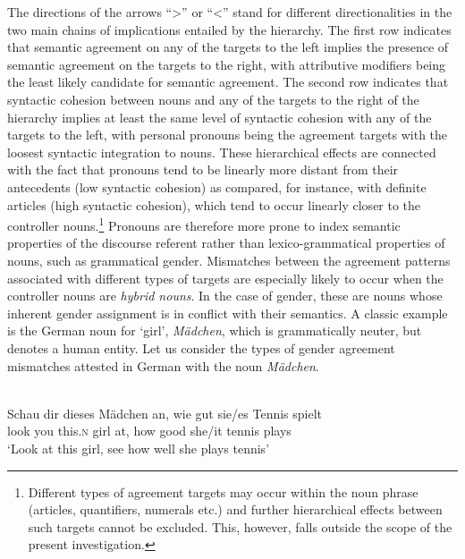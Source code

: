 \documentclass[output=collectionpaper]{langsci/langscibook}
\begin{document}
The directions of the arrows \textendash{} ``{\textgreater}'' or ``{\textless}'' \textendash{} stand for different directionalities in the two main chains of implications entailed by the hierarchy. The first row indicates that semantic agreement on any of the targets to the left implies the presence of semantic agreement on the targets to the right, with attributive modifiers being the least likely candidate for semantic agreement. The second row  indicates that syntactic cohesion between nouns and any of the targets to the right of the hierarchy implies at least the same level of syntactic cohesion with any of the targets to the left, with personal pronouns being the agreement targets with the loosest syntactic integration to nouns.
These hierarchical effects are connected with the fact that pronouns tend to be linearly more distant from their antecedents (low syntactic cohesion) as compared, for instance, with definite articles (high syntactic cohesion), which tend to occur linearly closer to the controller nouns.\footnote{Different types of agreement targets may occur within the noun phrase (articles, quantifiers, numerals etc.\@) and further hierarchical effects between such targets cannot be excluded. This, however, falls outside the scope of the present investigation.} Pronouns are therefore more prone to index semantic properties of the discourse referent rather than lexico-grammatical properties of nouns, such as grammatical gender. Mismatches between the agreement patterns associated with different types of targets are especially likely to occur when the controller nouns are \textit{hybrid nouns}. In the case of gender, these are nouns whose inherent gender assignment is in conflict with their semantics. A classic example is the German noun for `girl', \textit{M\"adchen}, which is grammatically neuter, but denotes a human entity. Let us consider the types of gender agreement mismatches attested in German with the noun \textit{M\"adchen}.


\ea\label{ex:dgm:2:madchen}
\\
\gll Schau dir dieses Mädchen an, wie gut sie/es Tennis spielt \\
     look you this.\textsc{n} girl at, how good she/it tennis plays\\
\glt `Look at this girl, see how well she plays tennis'\\
\z
\end{document}
